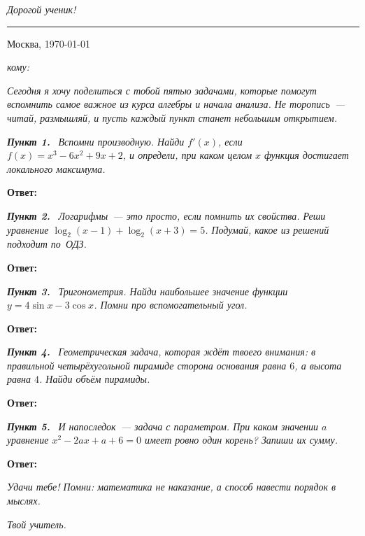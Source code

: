 \documentclass[a4paper,12pt]{article}
\renewcommand{\WorksheetTitle}[1]{%
  \par\noindent
  {\Large\itshape\color{wcink} #1}\par
  \vspace{1mm}
  {\color{wcink}\rule{30mm}{0.4pt}}\par
  \vspace{4mm}}
\newcommand{\LetterPara}[2]{%
  \par\vspace{2mm}
  \noindent
  \textbf{\itshape\color{wcink}Пункт #1.}\ #2
  \par}
\renewcommand{\FirstPageHeader}{%
  \par\noindent
  {\itshape\color{wcink}\rule{0pt}{4mm}Москва, \today}\hfill
  {\itshape\color{wcink}кому: \underline{\hspace{50mm}}}\par
  \vspace{4mm}}
\begin{document}
\WorksheetTitle{Дорогой ученик!}
\FirstPageHeader

\noindent
\itshape
Сегодня я хочу поделиться с тобой пятью задачами, которые помогут вспомнить
самое важное из курса алгебры и начала анализа. Не торопись~--- читай,
размышляй, и пусть каждый пункт станет небольшим открытием.\par
\upshape
\vspace{2mm}

\LetterPara{1}{%
  \itshape
  Вспомни производную. Найди $f'(x)$, если $f(x) = x^3 - 6x^2 + 9x + 2$,
  и определи, при каком целом $x$ функция достигает локального максимума.\par
  \upshape\vspace{1mm}
  \hfill\textbf{\color{wcink}Ответ:}~\AnswerField{1}%
}

\LetterPara{2}{%
  \itshape
  Логарифмы~--- это просто, если помнить их свойства. Реши уравнение
  $\log_2(x-1) + \log_2(x+3) = 5$. Подумай, какое из решений подходит по~ОДЗ.\par
  \upshape\vspace{1mm}
  \hfill\textbf{\color{wcink}Ответ:}~\AnswerField{2}%
}

\LetterPara{3}{%
  \itshape
  Тригонометрия. Найди наибольшее значение функции $y = 4\sin x - 3\cos x$.
  Помни про вспомогательный угол.\par
  \upshape\vspace{1mm}
  \hfill\textbf{\color{wcink}Ответ:}~\AnswerField{3}%
}

\LetterPara{4}{%
  \itshape
  Геометрическая задача, которая ждёт твоего внимания: в правильной
  четырёхугольной пирамиде сторона основания равна $6$, а высота равна $4$.
  Найди объём пирамиды.\par
  \upshape\vspace{1mm}
  \hfill\textbf{\color{wcink}Ответ:}~\AnswerField{4}%
}

\LetterPara{5}{%
  \itshape
  И напоследок~--- задача с параметром. При каком значении $a$ уравнение
  $x^2 - 2ax + a + 6 = 0$ имеет ровно один корень? Запиши их сумму.\par
  \upshape\vspace{1mm}
  \hfill\textbf{\color{wcink}Ответ:}~\AnswerField{5}%
}

\vspace{4mm}
\noindent
\itshape
Удачи тебе! Помни: математика не наказание, а способ навести порядок в мыслях.\par
\vspace{2mm}
\hfill {\itshape\color{wcink}Твой учитель.}
\upshape
\par

\end{document}
